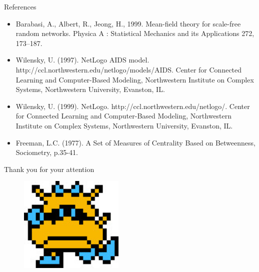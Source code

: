 \documentclass{beamer}
\begin{document}
\begin{frame}{References}
	\begin{itemize}
		\item Barabasi, A., Albert, R., Jeong, H., 1999. Mean-field theory for scale-free random networks. Physica A : Statistical Mechanics and its Applications 272, 173–187. 
		\item Wilensky, U. (1997). NetLogo AIDS model. http://ccl.northwestern.edu/netlogo/models/AIDS. Center for Connected Learning and Computer-Based Modeling, Northwestern Institute on Complex Systems, Northwestern University, Evanston, IL. 
		\item Wilensky, U. (1999). NetLogo. http://ccl.northwestern.edu/netlogo/. Center for Connected Learning and Computer-Based Modeling, Northwestern Institute on Complex Systems, Northwestern University, Evanston, IL. 
		\item Freeman, L.C. (1977). A Set of Measures of Centrality Based on Betweenness, Sociometry, p.35-41.
	\end{itemize}
\end{frame}

\begin{frame}
	\begin{center}
		Thank you for your attention
	\end{center}

	\begin{figure}[H]
		\centering
		\includegraphics[width=5.0cm]{./img/DrMario.png}
	\end{figure}
\end{frame}
\end{document}
